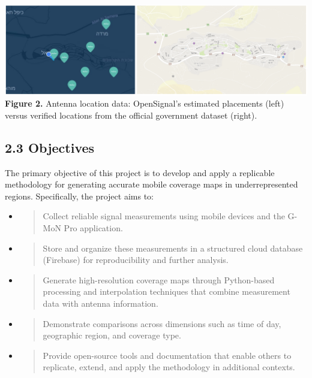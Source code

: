 \documentclass[11pt]{article}
\begin{document}
\includegraphics[width=1.0\textwidth]{figures/media/image1.png}
\textbf{Figure 2.} Antenna location data: OpenSignal's estimated
placements (left) versus verified locations from the official government
dataset (right).

\hypertarget{objectives}{%
\subsection{2.3 Objectives}\label{objectives}}

The primary objective of this project is to develop and apply a
replicable methodology for generating accurate mobile coverage maps in
underrepresented regions. Specifically, the project aims to:

\begin{itemize}
\item
  \begin{quote}
  Collect reliable signal measurements using mobile devices and the
  G-MoN Pro application.
  \end{quote}
\item
  \begin{quote}
  Store and organize these measurements in a structured cloud database
  (Firebase) for reproducibility and further analysis.
  \end{quote}
\item
  \begin{quote}
  Generate high-resolution coverage maps through Python-based processing
  and interpolation techniques that combine measurement data with
  antenna information.
  \end{quote}
\item
  \begin{quote}
  Demonstrate comparisons across dimensions such as time of day,
  geographic region, and coverage type.
  \end{quote}
\item
  \begin{quote}
  Provide open-source tools and documentation that enable others to
  replicate, extend, and apply the methodology in additional contexts.
  \end{quote}
\end{itemize}
\end{document}
